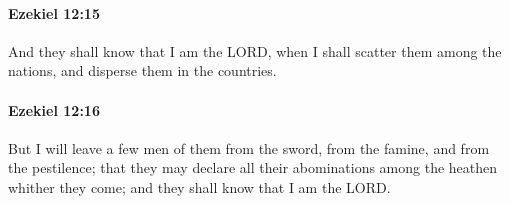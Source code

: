 		\paragraph{Ezekiel 12:15} %
			\label{EZEKIEL-12-15}

			And they shall know that I am the LORD, when I shall scatter them among the nations, and disperse them in the countries.


		\paragraph{Ezekiel 12:16} %
			\label{EZEKIEL-12-16}

			But I will leave a few men of them from the sword, from the famine, and from the pestilence; that they may declare all their abominations among the heathen whither they come; and they shall know that I am the LORD.


